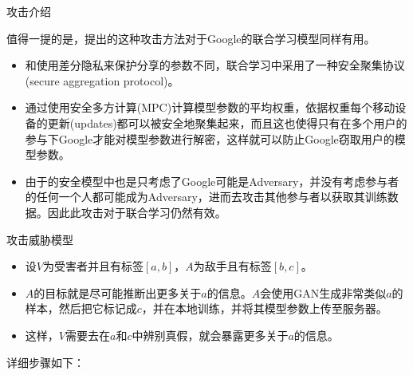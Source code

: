 \documentclass[aspectratio=169]{beamer}
\begin{document}
\begin{frame}{攻击}{介绍}

值得一提的是，\cite{hitaj2017deep}提出的这种攻击方法对于Google的联合学习模型同样有用。
\begin{itemize}
\item 和\cite{shokri2015privacy}使用差分隐私来保护分享的参数不同，联合学习中采用了一种安全聚集协议(secure aggregation protocol)\cite{bonawitz2017practical}。
\item 通过使用安全多方计算(MPC)计算模型参数的平均权重，依据权重每个移动设备的更新(updates)都可以被安全地聚集起来，而且这也使得只有在多个用户的参与下Google才能对模型参数进行解密，这样就可以防止Google窃取用户的模型参数。
\item 由于\cite{bonawitz2017practical}的安全模型中也是只考虑了Google可能是Adversary，并没有考虑参与者的任何一个人都可能成为Adversary，进而去攻击其他参与者以获取其训练数据。因此此攻击对于联合学习仍然有效。
\end{itemize}
\end{frame}

\begin{frame}{攻击}{威胁模型}
\begin{itemize}
\item 设$V$为受害者并且有标签$[a,b]$，$A$为敌手且有标签$[b,c]$。
\item $A$的目标就是尽可能推断出更多关于$a$的信息。$A$会使用GAN生成非常类似$a$的样本，然后把它标记成$c$，并在本地训练，并将其模型参数上传至服务器。
\item 这样，$V$需要去在$a$和$c$中辨别真假，就会暴露更多关于$a$的信息。
\end{itemize}
详细步骤如下：
\end{frame}
\end{document}
